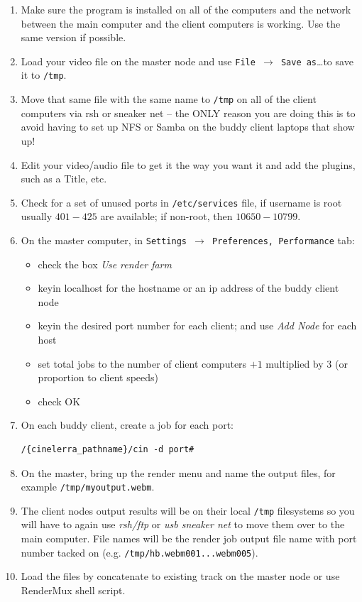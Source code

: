 \begin{enumerate}
\item Make sure the \CGG{} program is installed on all of the
  computers and the network between the main computer and the client
  computers is working.  Use the same version if possible.
\item Load your video file on the master node and use \texttt{File
    $\rightarrow$ Save as}\dots to save it to \texttt{/tmp}.
\item Move that same file with the same name to \texttt{/tmp} on all
  of the client computers via rsh or sneaker net -- the ONLY reason
  you are doing this is to avoid having to set up NFS or Samba on the
  buddy client laptops that show up!
\item Edit your video/audio file to get it the way you want it and
  add the plugins, such as a Title, etc.
\item Check for a set of unused ports in \texttt{/etc/services}
  file, if username is root usually $401-425$ are available; if
  non-root, then $10650-10799$.
\item On the master computer, in \texttt{Settings $\rightarrow$
    Preferences, Performance} tab:
  \begin{itemize}
  \item check the box \textit{Use render farm}
  \item keyin localhost for the hostname or an ip address of the
    buddy client node
  \item keyin the desired port number for each client; and use
    \textit{Add Node} for each host
  \item set total jobs to the number of client computers $+1$
    multiplied by $3$ (or proportion to client speeds)
  \item check OK
  \end{itemize}
\item On each buddy client, create a job for each port:
\begin{lstlisting}[style=sh]
/{cinelerra_pathname}/cin -d port#
\end{lstlisting}
\item On the master, bring up the render menu and name the output
  files, for example \texttt{/tmp/myoutput.webm}.
\item The client nodes output results will be on their local
  \texttt{/tmp} filesystems so you will have to again use
  \textit{rsh/ftp} or \textit{usb sneaker net} to move them over to
  the main computer.  File names will be the render job output file
  name with port number tacked on
  (e.g. \texttt{/tmp/hb.webm001...webm005}).
\item Load the files by concatenate to existing track on the master
  node or use RenderMux shell script.
\end{enumerate}


